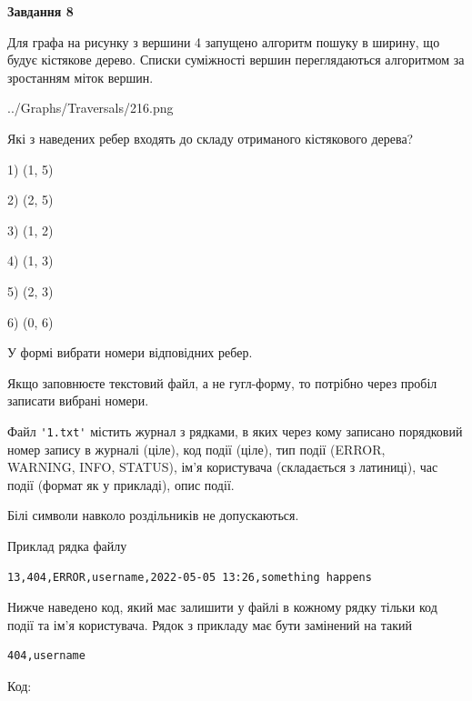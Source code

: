 \documentclass[12pt, ukrainian]{article}
\def\code#1{\Verb!#1!}
\begin{document}
{\begin {large}
{\begin {center}\textbf{Завдання 8}\end {center}}\par
Для графа на рисунку з вершини 4 запущено алгоритм пошуку в ширину, що будує кістякове дерево. Списки суміжності вершин переглядаються алгоритмом за зростанням міток вершин.\par
\begin{center}
	{../Graphs/Traversals/216.png}
\end{center}
\par Які з наведених ребер входять до складу отриманого кістякового дерева?\par
1) (1, 5)\par
2) (2, 5)\par
3) (1, 2)\par
4) (1, 3)\par
5) (2, 3)\par
6) (0, 6)\par
{\vskip 15pt} У формі вибрати номери відповідних ребер.


Якщо заповнюєте текстовий файл, а не гугл-форму, то потрібно через пробіл записа\-ти вибрані номери.\par
\newpage


Файл \code{'1.txt'} містить журнал з рядками, в яких через кому записано поряд\-ко\-вий номер запису в журналі (ціле), код події (ціле), тип події (ERROR, \\WARNING, INFO, STATUS), ім'я користувача (складається з латиниці), час події (фор\-мат як у прикладі), опис події.

Білі символи навколо роздільників не допускаються.

Приклад рядка файлу



\begin{verbatim}
13,404,ERROR,username,2022-05-05 13:26,something happens
\end{verbatim}


Нижче наведено код, який має залишити у файлі в кожному рядку тільки код події та ім'я користувача. Рядок з прикладу має бути замінений на такий



\begin{verbatim}
404,username
\end{verbatim}




Код:




\end{large}}
\end{document}
